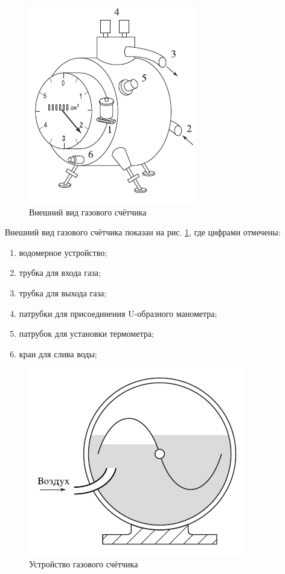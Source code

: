 \documentclass[12pt]{article}
\begin{document}
	\begin{figure}[!h]
	\caption{Внешний вид газового счётчика}
	\label{fig:gsout}
	\begin{center}
	\includegraphics[scale=0.7]{gsout.png}
	\end{center}
	\end{figure}

	Внешний вид газового счётчика показан на рис. \ref{fig:gsout}, где цифрами отмечены:
	\begin{enumerate}
		\item водомерное устройство;
		\item трубка для входа газа; \label{intr}
		\item трубка для выхода газа;
		\item патрубки для присоединения U-образного манометра;
		\item патрубок для установки термометра;
		\item кран для слива воды;
	\end{enumerate}
	
	\begin{figure}[!h]
	\caption{Устройство газового счётчика}
	\label{fig:gsin}
	\begin{center}
	\includegraphics[scale=0.7]{gsin.png}
	\end{center}
	\end{figure}
\end{document}
